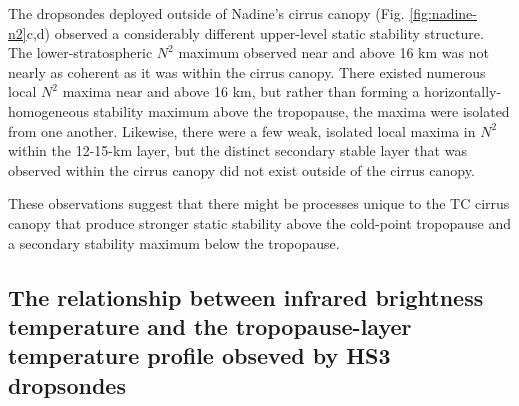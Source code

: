The dropsondes deployed outside of Nadine's cirrus canopy (Fig. \ref{fig:nadine-n2}c,d) observed a considerably different upper-level static stability structure.
The lower-stratospheric $N^2$ maximum observed near and above 16 km was not nearly as coherent as it was within the cirrus canopy.
There existed numerous local $N^2$ maxima near and above 16 km, but rather than forming a horizontally-homogeneous stability maximum above the tropopause, the maxima were isolated from one another.
Likewise, there were a few weak, isolated local maxima in $N^2$ within the 12-15-km layer, but the distinct secondary stable layer that was observed within the cirrus canopy did not exist outside of the cirrus canopy.

These observations suggest that there might be processes unique to the TC cirrus canopy that produce stronger static stability above the cold-point tropopause and a secondary stability maximum below the tropopause.

\subsection{The relationship between infrared brightness temperature and the tropopause-layer temperature profile obseved by HS3 dropsondes}
\label{hs3-irbt}


